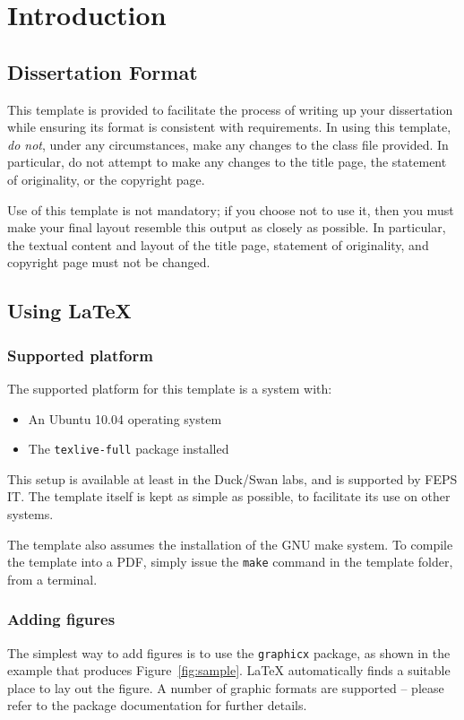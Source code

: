 
\chapter{Introduction}

\section{Dissertation Format}
This template is provided to facilitate the process of writing up your
dissertation while ensuring its format is consistent with requirements.
In using this template, \emph{do not}, under any circumstances, make any
changes to the class file provided.
In particular, do not attempt to make any changes to the title page, the
statement of originality, or the copyright page.

Use of this template is not mandatory; if you choose not to use it, then you
must make your final layout resemble this output as closely as possible.
In particular, the textual content and layout of the title page, statement of
originality, and copyright page must not be changed.

\section{Using \LaTeX{}}

\subsection{Supported platform}
The supported platform for this template is a system with:
\begin{itemize}
   \item An Ubuntu 10.04 operating system
   \item The \verb|texlive-full| package installed
\end{itemize}
This setup is available at least in the Duck/Swan labs, and is supported by
FEPS IT.
The template itself is kept as simple as possible, to facilitate its use on
other systems.

The template also assumes the installation of the GNU make system.
To compile the template into a PDF, simply issue the \verb|make| command
in the template folder, from a terminal.

\subsection{Adding figures}
The simplest way to add figures is to use the \verb|graphicx| package, as shown
in the example that produces Figure~\ref{fig:sample}.
\LaTeX{} automatically finds a suitable place to lay out the figure.
A number of graphic formats are supported -- please refer to the package
documentation for further details.

